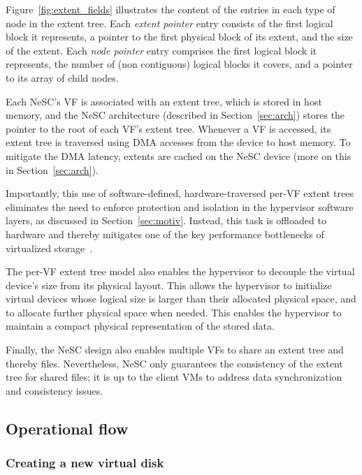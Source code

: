 Figure~\ref{fig:extent_fields} illustrates the content of the entries in each type of node in the extent tree. Each \emph{extent pointer} entry consists of the first logical block it represents, a pointer to the first physical block of its extent, and the size of the extent. Each \emph{node pointer} entry comprises the first logical block it represents, the number of (non contiguous) logical blocks it covers, and a pointer to its array of child nodes.

Each  NeSC's VF is associated with an extent tree, which is stored in host memory, and the NeSC architecture (described in Section~\ref{sec:arch}) stores the pointer to the root of each VF's extent tree. Whenever a VF is accessed, its extent tree is traversed using DMA accesses from the device to host memory. To mitigate the DMA latency, extents are cached on the NeSC device (more on this in Section~\ref{sec:arch}).

Importantly, this use of software-defined, hardware-traversed per-VF extent trees eliminates the need to enforce protection and isolation in the hypervisor software layers, as discussed in Section~\ref{sec:motiv}. Instead, this task is offloaded to hardware and thereby mitigates one of the key performance bottlenecks of virtualized storage~\cite{le12nested}.

The per-VF extent tree model also enables the hypervisor to decouple the virtual device's size from its physical layout. This allows the hypervisor to initialize virtual devices whose logical size is larger than their allocated physical space, and to allocate further physical space when needed. This enables the hypervisor to maintain a compact physical representation of the stored data.

Finally, the NeSC design also enables multiple VFs to share an extent tree and thereby files. Nevertheless, NeSC only guarantees the consistency of the extent tree for shared files; it is up to the client VMs to address data synchronization and consistency issues.

\subsection{Operational flow}

\subsubsection*{Creating a new virtual disk}

